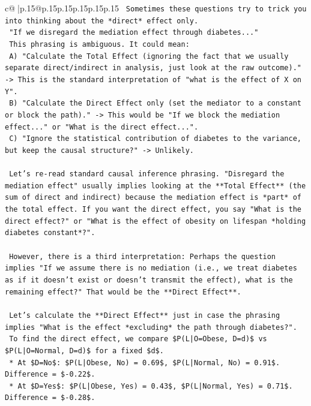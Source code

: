 \documentclass{article}
\begin{document}
{\begin{supertabular}{c@{$\;$}|p{.15\linewidth}@{}p{.15\linewidth}p{.15\linewidth}p{.15\linewidth}p{.15\linewidth}p{.15\linewidth}}
{{{\texttt{    Sometimes these questions try to trick you into thinking about the *direct* effect only.} \\
\texttt{    "If we disregard the mediation effect through diabetes..."} \\
\texttt{    This phrasing is ambiguous. It could mean:} \\
\texttt{    A) "Calculate the Total Effect (ignoring the fact that we usually separate direct/indirect in analysis, just look at the raw outcome)." {-}> This is the standard interpretation of "what is the effect of X on Y".} \\
\texttt{    B) "Calculate the Direct Effect only (set the mediator to a constant or block the path)." {-}> This would be "If we block the mediation effect..." or "What is the direct effect...".} \\
\texttt{    C) "Ignore the statistical contribution of diabetes to the variance, but keep the causal structure?" {-}> Unlikely.} \\
\\ 
\texttt{    Let's re{-}read standard causal inference phrasing. "Disregard the mediation effect" usually implies looking at the **Total Effect** (the sum of direct and indirect) because the mediation effect is *part* of the total effect. If you want the direct effect, you say "What is the direct effect?" or "What is the effect of obesity on lifespan *holding diabetes constant*?".} \\
\\ 
\texttt{    However, there is a third interpretation: Perhaps the question implies "If we assume there is no mediation (i.e., we treat diabetes as if it doesn't exist or doesn't transmit the effect), what is the remaining effect?" That would be the **Direct Effect**.} \\
\\ 
\texttt{    Let's calculate the **Direct Effect** just in case the phrasing implies "What is the effect *excluding* the path through diabetes?".} \\
\texttt{    To find the direct effect, we compare \$P(L|O=Obese, D=d)\$ vs \$P(L|O=Normal, D=d)\$ for a fixed \$d\$.} \\
\texttt{    *   At \$D=No\$: \$P(L|Obese, No) = 0.69\$, \$P(L|Normal, No) = 0.91\$. Difference = \${-}0.22\$.} \\
\texttt{    *   At \$D=Yes\$: \$P(L|Obese, Yes) = 0.43\$, \$P(L|Normal, Yes) = 0.71\$. Difference = \${-}0.28\$.} \\
\\ 
}}}
\end{supertabular}}
\end{document}
